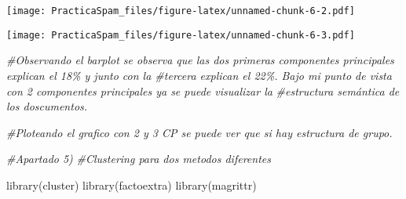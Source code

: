 \documentclass[
]{article}
\newenvironment{Shaded}{\begin{snugshade}}{\end{snugshade}}
\newcommand{\AttributeTok}[1]{\textcolor[rgb]{0.77,0.63,0.00}{#1}}
\newcommand{\CommentTok}[1]{\textcolor[rgb]{0.56,0.35,0.01}{\textit{#1}}}
\newcommand{\ConstantTok}[1]{\textcolor[rgb]{0.00,0.00,0.00}{#1}}
\newcommand{\DecValTok}[1]{\textcolor[rgb]{0.00,0.00,0.81}{#1}}
\newcommand{\FunctionTok}[1]{\textcolor[rgb]{0.00,0.00,0.00}{#1}}
\newcommand{\NormalTok}[1]{#1}
\newcommand{\SpecialCharTok}[1]{\textcolor[rgb]{0.00,0.00,0.00}{#1}}
\newcommand{\StringTok}[1]{\textcolor[rgb]{0.31,0.60,0.02}{#1}}
\begin{document}
\texttt{[image: PracticaSpam\_files/figure-latex/unnamed-chunk-6-2.pdf]}

\begin{Shaded}
\end{Shaded}

\texttt{[image: PracticaSpam\_files/figure-latex/unnamed-chunk-6-3.pdf]}

\begin{Shaded}
\begin{Highlighting}[]
  \CommentTok{\#Observando el barplot se observa que las dos primeras componentes principales explican el 18\% y junto con la        \#tercera explican el 22\%. Bajo mi punto de vista con 2 componentes principales ya se puede visualizar la }
  \CommentTok{\#estructura semántica de los doscumentos. }
  
  \CommentTok{\#Ploteando el grafico con 2 y 3 CP se puede ver que si hay estructura de grupo.}
\end{Highlighting}
\end{Shaded}

\begin{Shaded}
\begin{Highlighting}[]
  \CommentTok{\#Apartado 5)}
  \CommentTok{\#Clustering para dos metodos diferentes}
  
  \FunctionTok{library}\NormalTok{(cluster)}
  \FunctionTok{library}\NormalTok{(factoextra)}
  \FunctionTok{library}\NormalTok{(magrittr)}
\end{Highlighting}
\end{Shaded}
\end{document}
